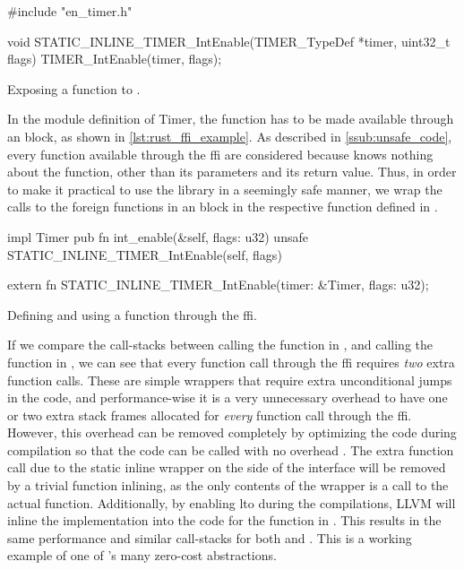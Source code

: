 \begin{listing}[h]
\begin{ccode}
#include "en_timer.h"

void STATIC_INLINE_TIMER_IntEnable(TIMER_TypeDef *timer,
                                   uint32_t flags) {
  TIMER_IntEnable(timer, flags);
}
\end{ccode}
\caption{Exposing a  function to {\rust}.}
\label{lst:exposing_static_inline}
\end{listing}

In the {\rust} module definition of Timer, the function has to be made available through an  block, as shown in \autoref{lst:rust_ffi_example}.
As described in \autoref{ssub:unsafe_code}, every function available through the \gls{ffi} are considered {\unsafe} because {\rust} knows nothing about the function, other than its parameters and its return value.
Thus, in order to make it practical to use the library in a seemingly safe manner, we wrap the calls to the foreign functions in an {\unsafe} block in the respective function defined in {\rust}.

\begin{listing}[h]
\begin{rustcode}
impl Timer {
  pub fn int_enable(&self, flags: u32) {
    unsafe { STATIC_INLINE_TIMER_IntEnable(self, flags) }
  }
}

extern {
  fn STATIC_INLINE_TIMER_IntEnable(timer: &Timer, flags: u32);
}
\end{rustcode}
\caption{Defining and using a function through the {\rust} \gls{ffi}.}
\label{lst:rust_ffi_example}
\end{listing}

If we compare the call-stacks between calling the  function in {\rust}, and calling the  function in {\C}, we can see that every function call through the \gls{ffi} requires \emph{two} extra function calls.
These are simple wrappers that require extra unconditional jumps in the code, and performance-wise it is a very unnecessary overhead to have one or two extra stack frames allocated for \emph{every} function call through the \gls{ffi}.
However, this overhead can be removed completely by optimizing the code during compilation so that the {\C} code can be called with no overhead \cite{web:rust_once_run_everywhere}.
The extra function call due to the static inline wrapper on the {\C} side of the interface will be removed by a trivial function inlining, as the only contents of the wrapper is a call to the actual function.
Additionally, by enabling \gls{lto} during the compilations, LLVM will inline the {\C} implementation into the code for the  function in {\rust}.
This results in the same performance and similar call-stacks for both {\C} and {\rust}.
This is a working example of one of {\rust}'s many zero-cost abstractions.

